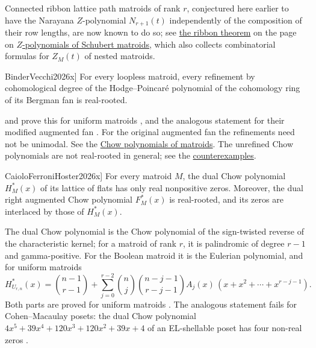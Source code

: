 Connected ribbon lattice path matroids of rank $r$, conjectured here earlier to
have the Narayana $Z$-polynomial $N_{r+1}(t)$ independently of the
composition of their row lengths, are now known to do so; see
\hyperref[conjRibbonMatroidZ]{the ribbon theorem} on the page on
\hyperref[schubertMatroidZ]{$Z$-polynomials of Schubert matroids}, which also
collects combinatorial formulas for $Z_M(t)$ of nested matroids.

\begin{conjecture}[Binder--Vecchi, \cite[Conj.~1.5]{BinderVecchi2026x}]
\label{conjRefinedChow}
For every loopless matroid, every refinement by cohomological degree of the
Hodge--Poincaré polynomial of the cohomology ring of its Bergman fan is
real-rooted.
\end{conjecture}

 and  prove this for uniform matroids
\cite[Thm.~1.4]{BinderVecchi2026x}, and the analogous statement for their
modified augmented fan \cite[Thm.~1.6]{BinderVecchi2026x}.  For the original
augmented fan the refinements need not be unimodal.  See the
\hyperref[matroidChowPolynomials]{Chow polynomials of matroids}.  The
unrefined Chow polynomials are not real-rooted in general; see the
\hyperref[realRootedCounterexamples]{counterexamples}.

\begin{conjecture}[Caiolo--Ferroni--Hoster, \cite[Conj.~7.3]{CaioloFerroniHoster2026x}]
\label{conjDualChow}
For every matroid $M$, the dual Chow polynomial $H^*_M(x)$ of its lattice
of flats has only real nonpositive zeros.  Moreover, the dual right
augmented Chow polynomial $F^*_M(x)$ is real-rooted, and its zeros are
interlaced by those of $H^*_M(x)$.
\end{conjecture}

The dual Chow polynomial is the Chow polynomial of the sign-twisted reverse
of the characteristic kernel; for a matroid of rank $r$, it is palindromic
of degree $r-1$ and gamma-positive.  For the Boolean matroid it is the
Eulerian polynomial, and for uniform matroids
\[
  H^*_{U_{r,n}}(x)=\binom{n-1}{r-1}
  +\sum_{j=0}^{r-2}\binom{n}{j}\binom{n-j-1}{r-j-1}
  A_j(x)\,(x+x^2+\dotsb+x^{r-j-1}).
\]
Both parts are proved for uniform matroids
\cite[Cor.~6.11]{CaioloFerroniHoster2026x}.  The analogous statement fails
for Cohen--Macaulay posets: the dual Chow polynomial
$4x^5+39x^4+120x^3+120x^2+39x+4$ of an EL-shellable poset has four
non-real zeros \cite[Rem.~7.4]{CaioloFerroniHoster2026x}.

